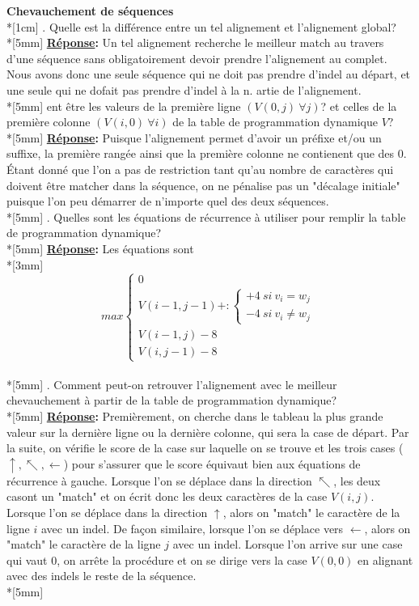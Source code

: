 \documentclass[11pt, letterpaper]{article}
\begin{document}
\par{
\textbf{Chevauchement de séquences} \\*[1cm]
. Quelle est la différence entre un tel alignement et l'alignement global? \\*[5mm]
\textbf{\underline{Réponse}:} Un tel alignement recherche le meilleur match au travers d'une séquence sans obligatoirement devoir prendre l'alignement au complet. Nous avons donc une seule séquence qui ne doit pas prendre d'indel au départ, et une seule qui ne dofait pas prendre d'indel à la n. artie de l'alignement. \\*[5mm]    ent être les valeurs de la première ligne $(V(0,j) \ \forall j)$? et celles de la première colonne $(V(i,0) \ \forall i)$ de la table de programmation dynamique $V$? \\*[5mm]
\textbf{\underline{Réponse}:} Puisque l'alignement permet d'avoir un préfixe et/ou un suffixe, la première rangée ainsi que la première colonne ne contienent que des 0. Étant donné que l'on a pas de restriction tant qu'au nombre de caractères qui doivent être matcher dans la séquence, on ne pénalise pas un "décalage initiale" puisque l'on peu démarrer de n'importe quel des deux séquences. \\*[5mm]
. Quelles sont les équations de récurrence à utiliser pour remplir la table de programmation dynamique? \\*[5mm]
\textbf{\underline{Réponse}:} Les équations sont \\*[3mm]
\center
\begin{equation}
	max \begin{cases}
	0 \\
	V(i-1,j-1) + : \begin{cases}
									+4 \ si \ v_i = w_j \\
									-4 \ si \ v_i \neq w_j
									\end{cases} \\
	V(i-1,j) - 8 \\
	V(i,j-1) - 8
	\end{cases}
\end{equation} \\*[5mm]
\flushleft
{}. Comment peut-on retrouver l'alignement avec le meilleur chevauchement à partir de la table de programmation dynamique? \\*[5mm]
\textbf{\underline{Réponse}:} Premièrement, on cherche dans le tableau la plus grande valeur sur la dernière ligne ou la dernière colonne, qui sera la case de départ. Par la suite, on vérifie le score de la case sur laquelle on se trouve et les trois cases ($\uparrow, \nwarrow, \leftarrow$) pour s'assurer que le score équivaut bien aux équations de récurrence à gauche. Lorsque l'on se déplace dans la direction $\nwarrow$, les deux casont un "match" et on écrit donc les deux caractères de la case $V(i,j)$. Lorsque l'on se déplace dans la direction $\uparrow$, alors on "match" le caractère de la ligne $i$ avec un indel. De façon similaire, lorsque l'on se déplace vers $\leftarrow$, alors on "match" le caractère de la ligne $j$ avec un indel. Lorsque l'on arrive sur une case qui vaut 0, on arrête la procédure et on se dirige vers la case $V(0,0)$ en alignant avec des indels le reste de la séquence. \\*[5mm]
}
\end{document}
